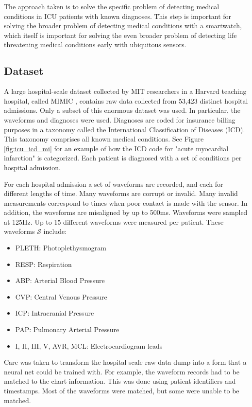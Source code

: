 The approach taken is to solve the specific problem of detecting medical conditions in ICU patients with known diagnoses.  This step is important for solving the broader problem of detecting medical conditions with a smartwatch, which itself is important for solving the even broader problem of detecting life threatening medical conditions early with ubiquitous sensors.

\subsection{Dataset}
\figIcuIcdMi
\figIcuExampleWaveforms

A large hospital-scale dataset collected by MIT researchers in a Harvard teaching hospital, called MIMIC \cite{johnson2016mimic}, contains raw data collected from 53,423 distinct hospital admissions.  Only a subset of this enormous dataset was used.  In particular, the waveforms and diagnoses were used.  Diagnoses are coded for insurance billing purposes in a taxonomy called the International Classification of Diseases (ICD).  This taxonomy comprises all known medical conditions. See Figure \ref{fig:icu_icd_mi} for an example of how the ICD code for "acute myocardial infarction" is categorized.  Each patient is diagnosed with a set of conditions per hospital admission.

For each hospital admission a set of waveforms are recorded, and each for different lengths of time.  Many waveforms are corrupt or invalid.  Many invalid measurements correspond to times when poor contact is made with the sensor.  In addition, the waveforms are misaligned by up to 500ms.  Waveforms were sampled at 125Hz.  Up to 15 different waveforms were measured per patient.  These waveforms $\mathcal{S}$ include:

\begin{itemize}
    \item PLETH: Photoplethysmogram
    \item RESP: Respiration
    \item ABP: Arterial Blood Pressure
    \item CVP: Central Venous Pressure
    \item ICP: Intracranial Pressure
    \item PAP: Pulmonary Arterial Pressure
    \item I, II, III, V, AVR, MCL: Electrocardiogram leads
\end{itemize}

Care was taken to transform the hospital-scale raw data dump into a form that a neural net could be trained with.  For example, the waveform records had to be matched to the chart information.  This was done using patient identifiers and timestamps.  Most of the waveforms were matched, but some were unable to be matched.

